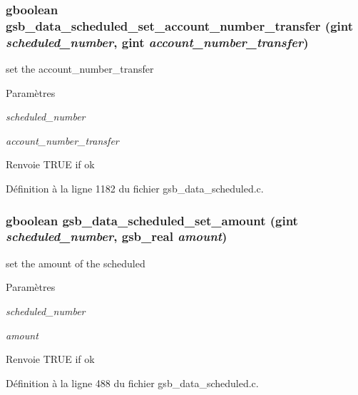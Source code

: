 \subsubsection[{gsb\_\-data\_\-scheduled\_\-set\_\-account\_\-number\_\-transfer}]{\setlength{\rightskip}{0pt plus 5cm}gboolean gsb\_\-data\_\-scheduled\_\-set\_\-account\_\-number\_\-transfer (gint {\em scheduled\_\-number}, \/  gint {\em account\_\-number\_\-transfer})}\label{gsb__data__scheduled_8c_ae87ba81a40b3b2906f57caf4234cb92f}
set the account\_\-number\_\-transfer


\begin{DoxyParams}{Paramètres}
\item[{\em scheduled\_\-number}]\item[{\em account\_\-number\_\-transfer}]\end{DoxyParams}
\begin{DoxyReturn}{Renvoie}
TRUE if ok 
\end{DoxyReturn}


Définition à la ligne 1182 du fichier gsb\_\-data\_\-scheduled.c.

\subsubsection[{gsb\_\-data\_\-scheduled\_\-set\_\-amount}]{\setlength{\rightskip}{0pt plus 5cm}gboolean gsb\_\-data\_\-scheduled\_\-set\_\-amount (gint {\em scheduled\_\-number}, \/  {\bf gsb\_\-real} {\em amount})}\label{gsb__data__scheduled_8c_a7015befa34c5a73725f1ba06512b5a09}
set the amount of the scheduled


\begin{DoxyParams}{Paramètres}
\item[{\em scheduled\_\-number}]\item[{\em amount}]\end{DoxyParams}
\begin{DoxyReturn}{Renvoie}
TRUE if ok 
\end{DoxyReturn}


Définition à la ligne 488 du fichier gsb\_\-data\_\-scheduled.c.


